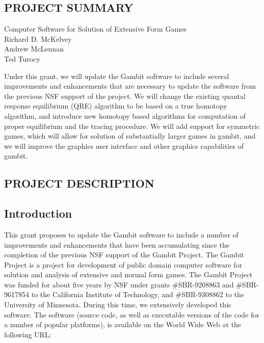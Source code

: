 \documentclass[12pt]{article}
\begin{document}
\begin{center}

\section{\bf  PROJECT SUMMARY} 

\bigskip
Computer Software for Solution of Extensive Form Games\\ 

\bigskip
Richard D. McKelvey \\
Andrew McLennan \\
Ted Turocy \\
\end{center}

Under this grant, we will update the Gambit software to include
several improvements and enhancements that are necessary to update the
software from the previous NSF support of the project.  We will
change the existing quantal response equilibrium (QRE) algorithm to be
based on a true homotopy algorithm, and introduce new homotopy based
algorithms for computation of proper equilibrium and the tracing
procedure.  We will add support for symmetric games, which will allow
for solution of substantially larger games in gambit, and we will
improve the graphics user interface and other graphics capabilities of
gambit.

\newpage
\tableofcontents

\newpage
{}
\begin{center}
\section{{\bf  PROJECT DESCRIPTION}}
\end{center}

\subsection{Introduction}

This grant proposes to update the Gambit software to include a number
of improvements and enhancements that have been accumulating since the
completion of the previous NSF support of the Gambit Project.  The
Gambit Project is a project for development of public domain computer
software for solution and analysis of extensive and normal form games.
The Gambit Project was funded for about five years by NSF under grants
\#SBR-9208863 and \#SBR-9617854 to the California Institute of
Technology, and \#SBR-9308862 to the University of Minnesota. During
this time, we extensively developed this software.  The software
(source code, as well as executable versions of the code for a number
of popular platforms), is available on the World Wide Web at the
following URL:
\end{document}
